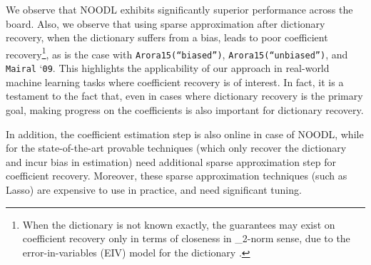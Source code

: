 \documentclass{article}
\def\[#1\]{{$#1$}}
\begin{document}
We observe that NOODL exhibits significantly superior performance across the board. Also, we observe that using sparse approximation after dictionary recovery, when the dictionary suffers from a bias, leads to poor coefficient recovery\footnote{When the dictionary is not known exactly, the guarantees may exist on coefficient recovery only in terms of closeness in \[\ell_2\]-norm sense, due to the error-in-variables (EIV) model for the dictionary \citep{Fuller2009, Wainwright2009}.}, as is the case with  \texttt{Arora15(``biased'')}, \texttt{Arora15(``unbiased'')}, and {\texttt{Mairal} `\texttt{09}}. This highlights the applicability of our approach in real-world machine learning tasks where coefficient recovery is of interest. In fact, it is a testament to the fact that, even in cases where dictionary recovery is the primary goal, making progress on the coefficients is also important for dictionary recovery.

In addition, the coefficient estimation step is also online in case of NOODL, while for the state-of-the-art provable techniques (which only recover the dictionary and incur bias in estimation) need additional sparse approximation step for coefficient recovery. Moreover, these sparse approximation techniques (such as Lasso) are expensive to use in practice, and need significant tuning. 
\end{document}
